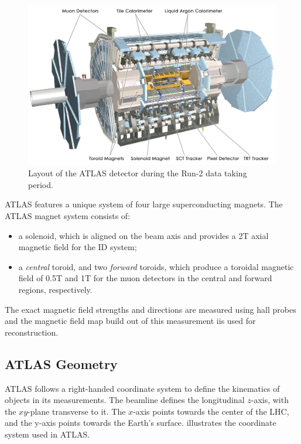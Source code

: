 \begin{figure}[!ht]
    \centering
    \includegraphics[width=0.8\linewidth]{figures/experiment/ATLAS-Run2.jpg}
    \caption{Layout of the ATLAS detector during the Run-2 data taking period.~\cite{Pequenao:1095924}}
    \label{fig:atlas-layout}
\end{figure}

ATLAS features a unique system of four large superconducting magnets. The ATLAS magnet system consists of:
\begin{itemize}
    \item a solenoid, which is aligned on the beam axis and provides a 2T axial magnetic field for the ID system;
    \item a \textit{central} toroid, and two \textit{forward} toroids, which produce a toroidal magnetic field of 0.5T and 1T for the muon detectors in the central and forward regions, respectively.
\end{itemize}

The exact magnetic field strengths and directions are measured using hall probes and the magnetic field map build out of this measurement iis used for reconstruction.

\subsection{ATLAS Geometry}

ATLAS follows a right-handed coordinate system to define the kinematics of objects in its measurements. The beamline defines the longitudinal $z$-axis, with the $xy$-plane transverse to it. The $x$-axis points towards the center of the LHC, and the y-axis points towards the Earth's surface.  illustrates the coordinate system used in ATLAS. 


